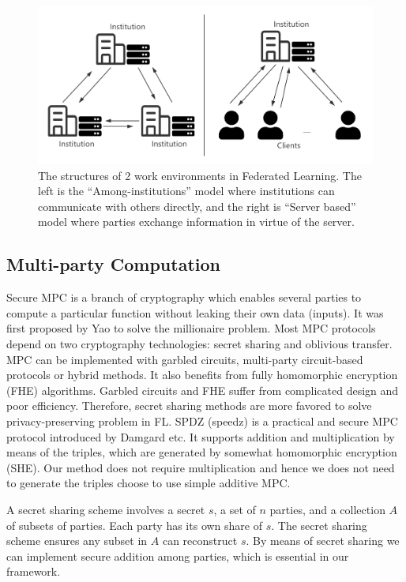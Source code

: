 \begin{figure}[!ht]
    \centering
    \includegraphics[width=\columnwidth]{img/fl_model.png}
    \caption{The structures of 2 work environments in Federated Learning. The left is the ``Among-institutions'' model where institutions can communicate with others directly, and the right is ``Server based'' model where parties exchange information in virtue of the server.}
    \label{fl_model}
\end{figure}


\subsection{Multi-party Computation}
Secure MPC is a branch of cryptography which enables several parties to compute a particular function without leaking their own data (inputs). It was first proposed by Yao to solve the millionaire problem\cite{Yao}. Most MPC protocols depend on two cryptography technologies: secret sharing\cite{Shamir} and oblivious transfer\cite{OT}. MPC can be implemented with garbled circuits, multi-party circuit-based protocols or hybrid methods\cite{mpc-sok}. It also benefits from fully homomorphic encryption (FHE) algorithms. Garbled circuits and FHE suffer from complicated design and poor efficiency. Therefore, secret sharing methods are more favored to solve privacy-preserving problem in FL. SPDZ\cite{SPDZ} (speedz) is a practical and secure MPC protocol introduced by Damgard etc. It supports addition and multiplication by means of the triples\cite{Triple}, which are generated by somewhat homomorphic encryption (SHE). Our method does not require multiplication and hence we does not need to generate the triples choose to use simple additive MPC.

A secret sharing scheme involves a secret $s$, a set of $n$ parties, and a collection $A$ of subsets of parties. Each party has its own share of $s$. The secret sharing scheme ensures any subset in $A$ can reconstruct $s$\cite{Secret-Sharing-survey}. By means of secret sharing we can implement secure addition among parties, which is essential in our framework.


